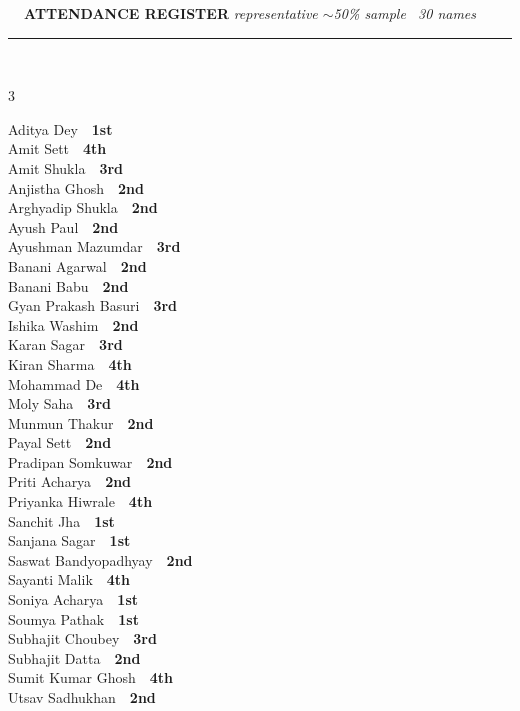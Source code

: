 \documentclass[11pt,a4paper]{article}
\begin{document}
\vspace{3pt}\noindent
{\footnotesize\bfseries\color{Slate}\faListOl~~ATTENDANCE REGISTER}%
\hfill{\scriptsize\itshape\color{Slate}representative $\sim$50\% sample \textperiodcentered\ 30 names}\\[3pt]
{\color{Line}\rule{\linewidth}{0.5pt}}\\[5pt]
\begingroup\footnotesize\setlength{\columnsep}{20pt}\setlength{\parskip}{1pt}%
\begin{multicols}{3}\raggedright
Aditya Dey~\dotfill~\textbf{1st}\\
Amit Sett~\dotfill~\textbf{4th}\\
Amit Shukla~\dotfill~\textbf{3rd}\\
Anjistha Ghosh~\dotfill~\textbf{2nd}\\
Arghyadip Shukla~\dotfill~\textbf{2nd}\\
Ayush Paul~\dotfill~\textbf{2nd}\\
Ayushman Mazumdar~\dotfill~\textbf{3rd}\\
Banani Agarwal~\dotfill~\textbf{2nd}\\
Banani Babu~\dotfill~\textbf{2nd}\\
Gyan Prakash Basuri~\dotfill~\textbf{3rd}\\
Ishika Washim~\dotfill~\textbf{2nd}\\
Karan Sagar~\dotfill~\textbf{3rd}\\
Kiran Sharma~\dotfill~\textbf{4th}\\
Mohammad De~\dotfill~\textbf{4th}\\
Moly Saha~\dotfill~\textbf{3rd}\\
Munmun Thakur~\dotfill~\textbf{2nd}\\
Payal Sett~\dotfill~\textbf{2nd}\\
Pradipan Somkuwar~\dotfill~\textbf{2nd}\\
Priti Acharya~\dotfill~\textbf{2nd}\\
Priyanka Hiwrale~\dotfill~\textbf{4th}\\
Sanchit Jha~\dotfill~\textbf{1st}\\
Sanjana Sagar~\dotfill~\textbf{1st}\\
Saswat Bandyopadhyay~\dotfill~\textbf{2nd}\\
Sayanti Malik~\dotfill~\textbf{4th}\\
Soniya Acharya~\dotfill~\textbf{1st}\\
Soumya Pathak~\dotfill~\textbf{1st}\\
Subhajit Choubey~\dotfill~\textbf{3rd}\\
Subhajit Datta~\dotfill~\textbf{2nd}\\
Sumit Kumar Ghosh~\dotfill~\textbf{4th}\\
Utsav Sadhukhan~\dotfill~\textbf{2nd}\\
\end{multicols}
\endgroup
\end{document}
